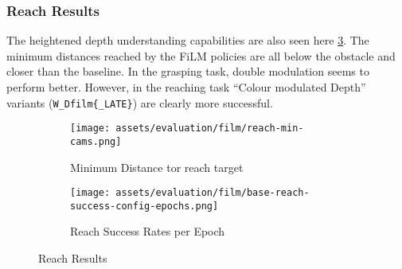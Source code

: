 \subsubsection{Reach Results}
The heightened depth understanding capabilities are also seen here \ref{fig:film-reach}. The minimum distances reached by the FiLM policies are all below the obstacle and closer than the baseline. In the grasping task, double modulation seems to perform better. However, in the reaching task ``Colour modulated Depth'' variants (\verb|W_Dfilm{_LATE}|) are clearly more successful.

\begin{figure}[htpb]
  \centering
  \begin{subfigure}{0.40\linewidth}
    \centering
    \texttt{[image: assets/evaluation/film/reach-min-cams.png]}
    \caption{Minimum Distance tor reach target}\label{subfig:film-reach-min}
  \end{subfigure}
  \begin{subfigure}{0.40\linewidth}
    \centering
    \texttt{[image: assets/evaluation/film/base-reach-success-config-epochs.png]}
    \caption{Reach Success Rates per Epoch}\label{subfig:film-reach-success}
  \end{subfigure}
  \caption{Reach Results}\label{fig:film-reach}
\end{figure}

